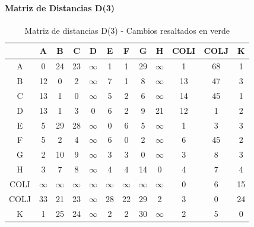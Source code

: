 \documentclass[12pt]{article}
\begin{document}
\paragraph{Matriz de Distancias D(3)}
\begin{table}[h!]
\centering
\begin{tabular}{|c|c|c|c|c|c|c|c|c|c|c|c|}
\hline
 & A & B & C & D & E & F & G & H & COLI & COLJ & K \\\hline
A & 0 & \cellcolor{lightgreen} 24 & 23 & $\infty$ & 1 & 1 & \cellcolor{lightgreen} 29 & $\infty$ & 1 & \cellcolor{lightgreen} 68 & 1 \\\hline
B & 12 & 0 & 2 & $\infty$ & \cellcolor{lightgreen} 7 & 1 & \cellcolor{lightgreen} 8 & $\infty$ & 13 & \cellcolor{lightgreen} 47 & \cellcolor{lightgreen} 3 \\\hline
C & 13 & 1 & 0 & $\infty$ & 5 & 2 & 6 & $\infty$ & 14 & 45 & 1 \\\hline
D & 13 & 1 & 3 & 0 & 6 & 2 & \cellcolor{lightgreen} 9 & 21 & 12 & 1 & 2 \\\hline
E & 5 & \cellcolor{lightgreen} 29 & 28 & $\infty$ & 0 & 6 & 5 & $\infty$ & 1 & 3 & 3 \\\hline
F & 5 & 2 & 4 & $\infty$ & 6 & 0 & 2 & $\infty$ & 6 & 45 & 2 \\\hline
G & 2 & \cellcolor{lightgreen} 10 & 9 & $\infty$ & 3 & 3 & 0 & $\infty$ & 3 & 8 & 3 \\\hline
H & 3 & 7 & 8 & $\infty$ & 4 & 4 & \cellcolor{lightgreen} 14 & 0 & 4 & 7 & 4 \\\hline
COLI & $\infty$ & $\infty$ & $\infty$ & $\infty$ & $\infty$ & $\infty$ & $\infty$ & $\infty$ & 0 & 6 & 15 \\\hline
COLJ & 33 & 21 & 23 & $\infty$ & \cellcolor{lightgreen} 28 & 22 & \cellcolor{lightgreen} 29 & 2 & 3 & 0 & \cellcolor{lightgreen} 24 \\\hline
K & 1 & \cellcolor{lightgreen} 25 & 24 & $\infty$ & 2 & 2 & \cellcolor{lightgreen} 30 & $\infty$ & 2 & 5 & 0 \\\hline
\end{tabular}
\caption{Matriz de distancias D(3) - Cambios resaltados en verde}
\end{table}
\end{document}
